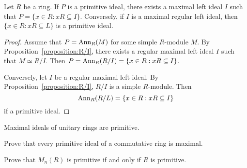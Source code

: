 %

\begin{lemma}
	\label{lemma:maxprim}
	Let $R$ be a ring. If $P$ is a primitive ideal, there exists a maximal 
	left ideal $I$ such that $P=\{x\in R:xR\subseteq I\}$.
	Conversely, if $I$ is a maximal regular left ideal, then 
	$\{x\in R:xR\subseteq L\}$ is a primitive ideal. 
\end{lemma}

\begin{proof}
	Assume that $P=\operatorname{Ann}_R(M)$ for some simple $R$-module $M$. By
	Proposition~\ref{proposition:R/I}, there exists a regular maximal 
	left ideal 
	$I$ such that $M\simeq R/I$. Then $P=\operatorname{Ann}_R(R/I)=\{x\in
	R:xR\subseteq I\}$. 

	Conversely, let $I$ be a regular maximal left ideal. By
	Proposition~\ref{proposition:R/I}, $R/I$ is a simple $R$-module. Then
	\[
	\operatorname{Ann}_R(R/L)=\{x\in R:xR\subseteq I\}
	\]
	if a primitive ideal.
\end{proof}


\begin{exercise}
\label{xca:maximal=>prim}
    Maximal ideals of unitary rings are primitive.  
\end{exercise}

\begin{exercise}
	Prove that every primitive ideal of a commutative ring is maximal.
\end{exercise}

\begin{exercise}
    Prove that $M_n(R)$ is primitive if and only if $R$ is primitive.
\end{exercise}



